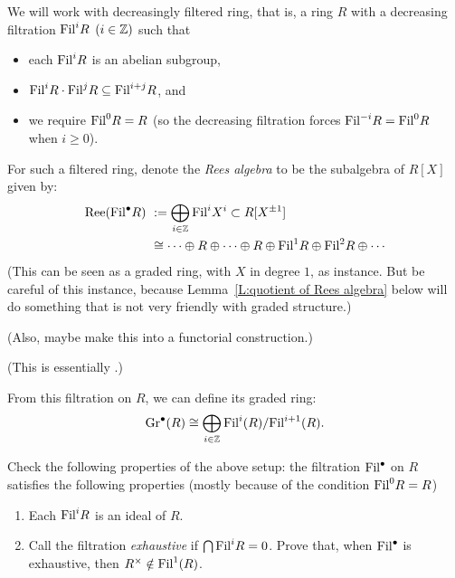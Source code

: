	
	\begin{definition}
		We will work with decreasingly filtered ring, that is, a ring $R$ with a decreasing filtration $\mathrm{Fil}^iR$ $(i \in \mathbb{Z})$ such that
		\begin{itemize}
			\item each $\mathrm{Fil}^iR$ is an abelian subgroup,
			\item $\mathrm{Fil}^iR \cdot \mathrm{Fil}^j R \subseteq \mathrm{Fil}^{i+j}R$, and
			\item we require $\mathrm{Fil}^0R = R$ (so the decreasing filtration forces $\mathrm{Fil}^{-i} R = \mathrm{Fil}^0R$ when $i \geq 0$).
		\end{itemize}
		
		For such a filtered ring, denote the \emph{Rees algebra} to be the subalgebra of $R[X]$ given by:
		\begin{align*}
			\mathrm{Ree}(\mathrm{Fil}^\bullet R)\ &: = \bigoplus_{i \in \mathbb{Z}} \mathrm{Fil}^i X^i \subset R[X^{\pm 1}]
			\\ & \cong \cdots \oplus R \oplus \cdots \oplus R \oplus \mathrm{Fil}^1R \oplus \mathrm{Fil}^2R \oplus \cdots 
		\end{align*}
		(This can be seen as a graded ring, with $X$ in degree $1$, as instance. But be careful of this instance, because Lemma~\ref{L:quotient of Rees algebra} below will do something that is not very friendly with graded structure.)
		
		
		
		(Also, maybe make this into a functorial construction.)
		
		(This is essentially \cite[page 170]{eisenbud}.)
		
		From this filtration on $R$, we can define its graded ring:
		$$
		\mathrm{Gr}^\bullet(R) \cong \bigoplus_{i \in \mathbb{Z}} \mathrm{Fil}^i(R)/ \mathrm{Fil}^{i+1}(R).
		$$
	\end{definition}
	
	\begin{lemma}
		Check the following properties of the above setup: the filtration $\mathrm{Fil}^\bullet $ on $R$ satisfies the following properties (mostly because of the condition $\mathrm{Fil}^0R = R$)
		\begin{enumerate}
			\item Each $\mathrm{Fil}^iR$ is an ideal of $R$.
			\item Call the filtration \emph{exhaustive} if $\bigcap \mathrm{Fil}^iR = 0$. Prove that, when $\mathrm{Fil}^\bullet$ is exhaustive, then $R^\times \notin \mathrm{Fil}^1(R)$.
		\end{enumerate}
		
	\end{lemma}
	
